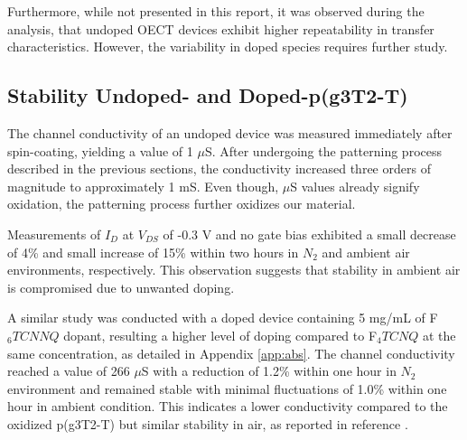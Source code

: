 Furthermore, while not presented in this report, it was observed during the analysis, that undoped OECT devices exhibit higher repeatability in transfer characteristics. %
However, the variability in doped species requires further study. %

\subsection{Stability Undoped- and Doped-p(g3T2-T)}
The channel conductivity of an undoped device was measured immediately after spin-coating, yielding a value of 1 $\mu$S. After undergoing the patterning process described in the previous sections, the conductivity increased three orders of magnitude to approximately 1 mS. Even though, $\mu$S values already signify oxidation, the patterning process further oxidizes our material. %

Measurements of $I_{D}$ at $V_{DS}$ of -0.3 V and no gate bias exhibited a small decrease of 4\% and small increase of 15\% within two hours in $N_{2}$ and ambient air environments, respectively. This observation suggests that stability in ambient air is compromised due to unwanted doping.

A similar study was conducted with a doped device containing 5 mg/mL of F$_{6}TCNNQ$ dopant, resulting a higher level of doping compared to F$_{4}TCNQ$ at the same concentration, as detailed in Appendix \ref{app:abs}. The channel conductivity reached a value of 266 $\mu$S with a reduction of 1.2\% within one hour in $N_{2}$ environment and remained stable with minimal fluctuations of 1.0\% within one hour in ambient condition. This indicates a lower conductivity compared to the oxidized p(g3T2-T) but similar stability in air, as reported in reference \cite{tanTuningOrganicElectrochemical2022}.

